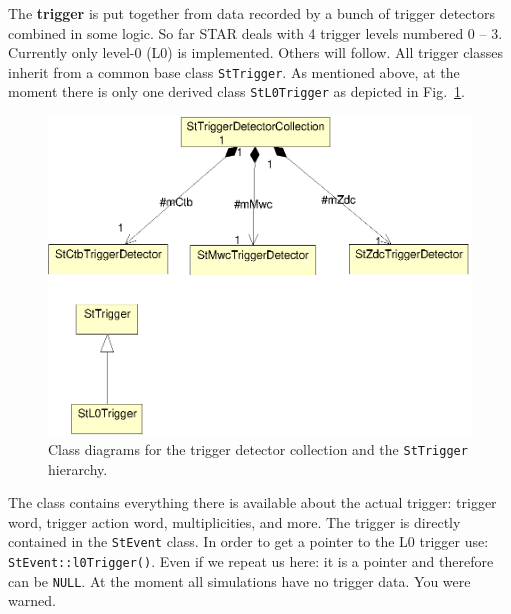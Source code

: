 \documentclass[twoside]{article}
\begin{document}
The \textbf{trigger} is put together from data recorded by a bunch of
trigger detectors combined in some logic. So far STAR deals with 4
trigger levels numbered 0 -- 3.  Currently only level-0 (L0) is
implemented. Others will follow.  All trigger classes inherit from a
common base class \texttt{StTrigger}.  As mentioned above, at the
moment there is only one derived class \texttt{StL0Trigger} as
depicted in Fig.~\ref{fig:umlTrigger}.
\begin{figure}[htb]
    \begin{center}
        \includegraphics{trigger.eps}
        \caption{Class diagrams for the trigger detector collection and
            the \texttt{StTrigger} hierarchy.}
        \label{fig:umlTrigger}
    \end{center}
\end{figure}
The class contains everything there is available about the actual
trigger: trigger word, trigger action word, multiplicities, and more.
The trigger is directly contained in the \texttt{StEvent} class. In
order to get a pointer to the L0 trigger use:
\texttt{StEvent::l0Trigger()}. Even if we repeat us here: it is a
pointer and therefore can be \texttt{NULL}. At the moment all
simulations have no trigger data. You were warned.
\end{document}
